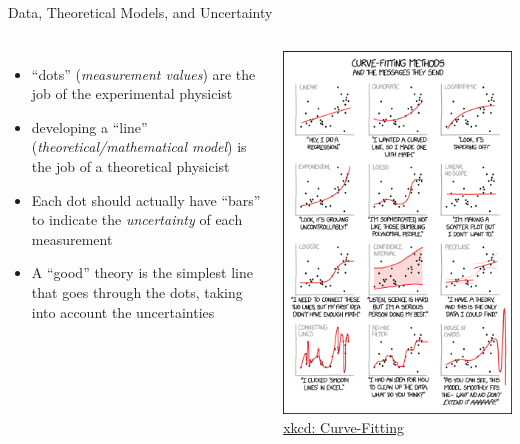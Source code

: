 \documentclass[12pt]{beamer}
\begin{document}
\begin{frame}{Data, Theoretical Models, and Uncertainty}

\begin{columns}[T]
    \begin{itemize}
    \item ``dots'' ({\em measurement values}) are the job of the experimental physicist
    \item developing a ``line'' ({\em theoretical/mathematical model}) is the job of a theoretical physicist
    \item Each dot should actually have ``bars'' to indicate the {\em uncertainty} of each measurement
    \item A ``good'' theory is the simplest line that goes through the dots, taking into account the uncertainties
    \end{itemize}
      \includegraphics[width=\textwidth]{images/xkcd_curve-fitting}\\
      {\tiny \href{https://xkcd.com/2048/}{xkcd: Curve-Fitting}}
 \end{columns}
 

\end{frame}
\end{document}
